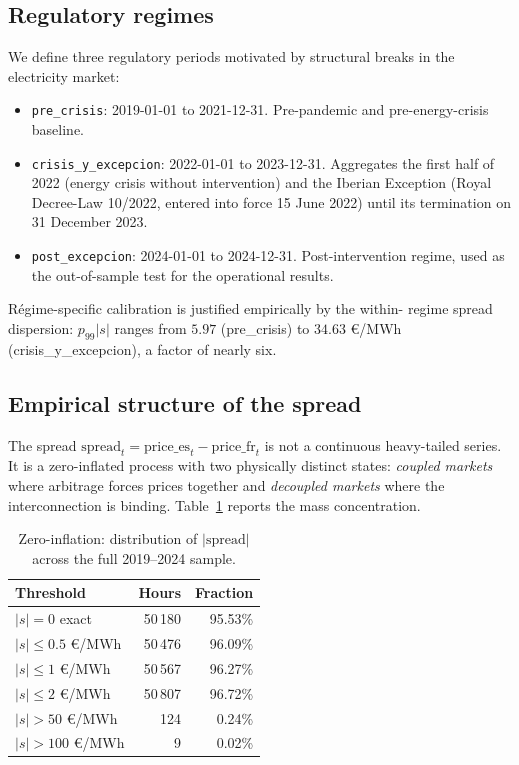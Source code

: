 \documentclass[11pt,a4paper]{article}
\begin{document}
\subsection{Regulatory regimes}\label{sec:regimes}

We define three regulatory periods motivated by structural breaks in
the electricity market:

\begin{itemize}
\item \texttt{pre\_crisis}: 2019-01-01 to 2021-12-31. Pre-pandemic
and pre-energy-crisis baseline.
\item \texttt{crisis\_y\_excepcion}: 2022-01-01 to 2023-12-31.
Aggregates the first half of 2022 (energy crisis without intervention)
and the Iberian Exception (Royal Decree-Law 10/2022, entered into
force 15 June 2022) until its termination on 31 December 2023.
\item \texttt{post\_excepcion}: 2024-01-01 to 2024-12-31.
Post-intervention regime, used as the out-of-sample test for the
operational results.
\end{itemize}

Régime-specific calibration is justified empirically by the within-
regime spread dispersion: $p_{99}|s|$ ranges from $5.97$ (pre\_crisis)
to $34.63$ €/MWh (crisis\_y\_excepcion), a factor of nearly six.

\subsection{Empirical structure of the spread}\label{sec:dgp}

The spread $\mathrm{spread}_t = \mathrm{price\_es}_t -
\mathrm{price\_fr}_t$ is not a continuous heavy-tailed series. It is
a zero-inflated process with two physically distinct states:
\emph{coupled markets} where arbitrage forces prices together and
\emph{decoupled markets} where the interconnection is binding.
Table~\ref{tab:zero-inflation} reports the mass concentration.

\begin{table}[H]
\centering
\small
\caption{Zero-inflation: distribution of $|\mathrm{spread}|$ across
the full 2019--2024 sample.}
\label{tab:zero-inflation}
\begin{tabular}{lrr}
\toprule
\textbf{Threshold} & \textbf{Hours} & \textbf{Fraction} \\
\midrule
$|s| = 0$ exact            & 50\,180 & 95.53\% \\
$|s| \leq 0.5$ €/MWh       & 50\,476 & 96.09\% \\
$|s| \leq 1$ €/MWh         & 50\,567 & 96.27\% \\
$|s| \leq 2$ €/MWh         & 50\,807 & 96.72\% \\
$|s| > 50$ €/MWh           &     124 & 0.24\% \\
$|s| > 100$ €/MWh          &       9 & 0.02\% \\
\bottomrule
\end{tabular}
\end{table}
\end{document}
